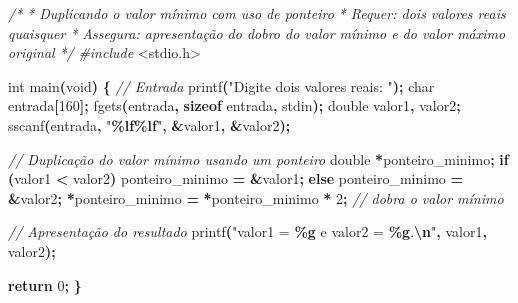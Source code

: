 \documentclass[
  11pt,
  a4paper,
]{scrbook}
\newenvironment{Shaded}{\begin{snugshade}}{\end{snugshade}}
\newcommand{\CommentTok}[1]{\textcolor[rgb]{0.56,0.35,0.01}{\textit{#1}}}
\newcommand{\ControlFlowTok}[1]{\textcolor[rgb]{0.13,0.29,0.53}{\textbf{#1}}}
\newcommand{\DataTypeTok}[1]{\textcolor[rgb]{0.13,0.29,0.53}{#1}}
\newcommand{\DecValTok}[1]{\textcolor[rgb]{0.00,0.00,0.81}{#1}}
\newcommand{\ImportTok}[1]{#1}
\newcommand{\KeywordTok}[1]{\textcolor[rgb]{0.13,0.29,0.53}{\textbf{#1}}}
\newcommand{\NormalTok}[1]{#1}
\newcommand{\OperatorTok}[1]{\textcolor[rgb]{0.81,0.36,0.00}{\textbf{#1}}}
\newcommand{\PreprocessorTok}[1]{\textcolor[rgb]{0.56,0.35,0.01}{\textit{#1}}}
\newcommand{\SpecialCharTok}[1]{\textcolor[rgb]{0.81,0.36,0.00}{\textbf{#1}}}
\newcommand{\StringTok}[1]{\textcolor[rgb]{0.31,0.60,0.02}{#1}}
\begin{document}
\begin{Shaded}
\begin{Highlighting}[]
\CommentTok{/*}
\CommentTok{ * Duplicando o valor mínimo com uso de ponteiro}
\CommentTok{ * Requer: dois valores reais quaisquer}
\CommentTok{ * Assegura: apresentação do dobro do valor mínimo e do valor máximo original}
\CommentTok{ */}
\PreprocessorTok{\#include }\ImportTok{\textless{}stdio.h\textgreater{}}

\DataTypeTok{int}\NormalTok{ main}\OperatorTok{(}\DataTypeTok{void}\OperatorTok{)} \OperatorTok{\{}
    \CommentTok{// Entrada}
\NormalTok{    printf}\OperatorTok{(}\StringTok{"Digite dois valores reais: "}\OperatorTok{);}
    \DataTypeTok{char}\NormalTok{ entrada}\OperatorTok{[}\DecValTok{160}\OperatorTok{];}
\NormalTok{    fgets}\OperatorTok{(}\NormalTok{entrada}\OperatorTok{,} \KeywordTok{sizeof}\NormalTok{ entrada}\OperatorTok{,}\NormalTok{ stdin}\OperatorTok{);}
    \DataTypeTok{double}\NormalTok{ valor1}\OperatorTok{,}\NormalTok{ valor2}\OperatorTok{;}
\NormalTok{    sscanf}\OperatorTok{(}\NormalTok{entrada}\OperatorTok{,} \StringTok{"}\SpecialCharTok{\%lf\%lf}\StringTok{"}\OperatorTok{,} \OperatorTok{\&}\NormalTok{valor1}\OperatorTok{,} \OperatorTok{\&}\NormalTok{valor2}\OperatorTok{);}

    \CommentTok{// Duplicação do valor mínimo usando um ponteiro}
    \DataTypeTok{double} \OperatorTok{*}\NormalTok{ponteiro\_minimo}\OperatorTok{;}
    \ControlFlowTok{if} \OperatorTok{(}\NormalTok{valor1 }\OperatorTok{\textless{}}\NormalTok{ valor2}\OperatorTok{)}
\NormalTok{        ponteiro\_minimo }\OperatorTok{=} \OperatorTok{\&}\NormalTok{valor1}\OperatorTok{;}
    \ControlFlowTok{else}
\NormalTok{        ponteiro\_minimo }\OperatorTok{=} \OperatorTok{\&}\NormalTok{valor2}\OperatorTok{;}
    \OperatorTok{*}\NormalTok{ponteiro\_minimo }\OperatorTok{=} \OperatorTok{*}\NormalTok{ponteiro\_minimo }\OperatorTok{*} \DecValTok{2}\OperatorTok{;}  \CommentTok{// dobra o valor mínimo}

    \CommentTok{// Apresentação do resultado}
\NormalTok{    printf}\OperatorTok{(}\StringTok{"valor1 = }\SpecialCharTok{\%g}\StringTok{ e valor2 = }\SpecialCharTok{\%g}\StringTok{.}\SpecialCharTok{\textbackslash{}n}\StringTok{"}\OperatorTok{,}\NormalTok{ valor1}\OperatorTok{,}\NormalTok{ valor2}\OperatorTok{);}

    \ControlFlowTok{return} \DecValTok{0}\OperatorTok{;}
\OperatorTok{\}}
\end{Highlighting}
\end{Shaded}
\end{document}
